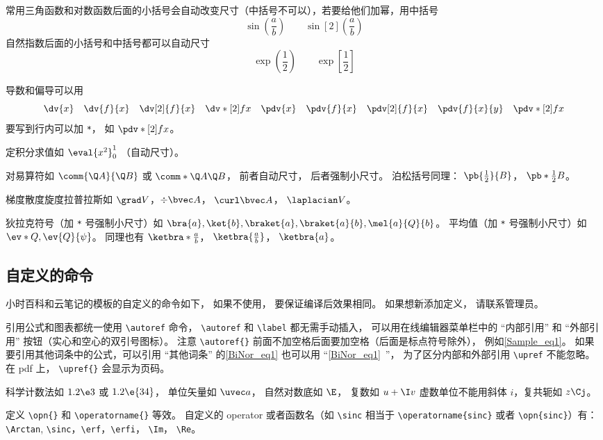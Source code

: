 常用三角函数和对数函数后面的小括号会自动改变尺寸（中括号不可以），若要给他们加幂，用中括号
\begin{equation}
\sin(\frac ab) \qquad \sin[2](\frac ab)
\end{equation}
自然指数后面的小括号和中括号都可以自动尺寸
\begin{equation}
\exp(\frac12) \qquad \exp[\frac12]
\end{equation}

导数和偏导可以用
\begin{equation}
\dv{x} \quad \dv{f}{x} \quad \dv[2]{f}{x} \quad \dv*[2]{f}{x} \quad
\pdv{x} \quad \pdv{f}{x} \quad \pdv[2]{f}{x} \quad \pdv{f}{x}{y} \quad \pdv*[2]{f}{x}
\end{equation}
要写到行内可以加 \verb|*|， 如 $\pdv*[2]{f}{x}$。

定积分求值如 $\eval{x^2}_0^1$ （自动尺寸）。

对易算符如 $\comm{\Q A}{\Q B}$ 或 $\comm*{\Q A}{\Q B}$， 前者自动尺寸， 后者强制小尺寸。 泊松括号同理： $\pb{\frac12}{B}$， $\pb*{\frac12}{B}$。

梯度散度旋度拉普拉斯如 $\grad V$，$\div\bvec A$， $\curl\bvec A$， $\laplacian V$。

狄拉克符号（加 \verb|*| 号强制小尺寸）如 $\bra{a}, \ket{b}, \braket{a}, \braket{a}{b}, \mel{a}{Q}{b}$。 平均值（加 \verb|*| 号强制小尺寸）如 $\ev*{Q}, \ev{Q}{\psi}$。 同理也有 $\ketbra*{\frac{a}{b}}$， $\ketbra{\frac{a}{b}}$， $\ketbra{a}$。


\subsection{自定义的命令}
小时百科和云笔记的模板的自定义的命令如下， 如果不使用， 要保证编译后效果相同。 如果想新添加定义， 请联系管理员。

引用公式和图表都统一使用 \verb|\autoref| 命令， \verb|\autoref| 和 \verb|\label| 都无需手动插入， 可以用在线编辑器菜单栏中的 “内部引用” 和 “外部引用” 按钮（实心和空心的双引号图标）。 注意 \verb|\autoref{}| 前面不加空格后面要加空格（后面是标点符号除外）， 例如\autoref{Sample_eq1}。 如果要引用其他词条中的公式，可以引用 “其他词条” 的\autoref{BiNor_eq1} 也可以用 “\autoref{BiNor_eq1}~”， 为了区分内部和外部引用 \verb|\upref| 不能忽略。 在 pdf 上， \verb|\upref{}| 会显示为页码。

科学计数法如 $1.2\e3$ 或 $1.2\e{34}$， 单位矢量如 $\uvec a$， 自然对数底如 $\E$， 复数如 $u+\I v$ 虚数单位不能用斜体 $i$，复共轭如 $z\Cj$。

定义 \verb|\opn{}| 和 \verb|\operatorname{}| 等效。 自定义的 operator 或者函数名（如 \verb|\sinc| 相当于 \verb|\operatorname{sinc}| 或者 \verb|\opn{sinc}|）有： \verb|\Arctan|, \verb|\sinc|，\verb|\erf|，\verb|\erfi|， \verb|\Im|， \verb|\Re|。

